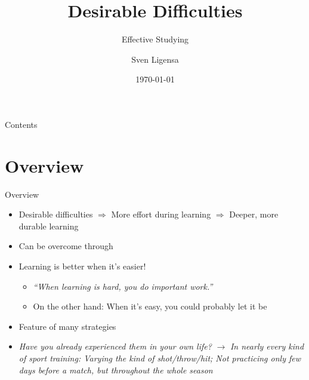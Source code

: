 \documentclass{ercisbeamer}
\title{Desirable Difficulties}
\subtitle{Effective Studying}
\author{Sven Ligensa}
\institute{European Research Center for Information Systems (ERCIS)}
\date{\today}
\begin{document}
\begin{frame}
    \begin{tbox}
        \titlepage
    \end{tbox}
\end{frame}
\setbgimage{}

\begin{frame}{Contents}
    \tableofcontents
\end{frame}

\section{Overview}
\begin{frame}{Overview}
    \pause
    \begin{tbox}
        \begin{itemize}
            \item Desirable difficulties $\Rightarrow$ More effort during learning $\Rightarrow$ Deeper, more durable learning
            \item Can be overcome through 
            \item Learning is  better when it's easier!
            \begin{itemize}
                \item \emph{``When learning is hard, you do important work.'' }
                \item On the other hand: When it's easy, you could probably let it be
            \end{itemize}
            \item Feature of many  strategies 
            \item \emph{Have you already experienced them in your own life?} \pause $\rightarrow$ \emph{In nearly every kind of sport training: Varying the kind of shot/throw/hit; Not practicing only few days before a match, but throughout the whole season}
        \end{itemize}
    \end{tbox}
\end{frame}
\setbgimage{}
\end{document}
